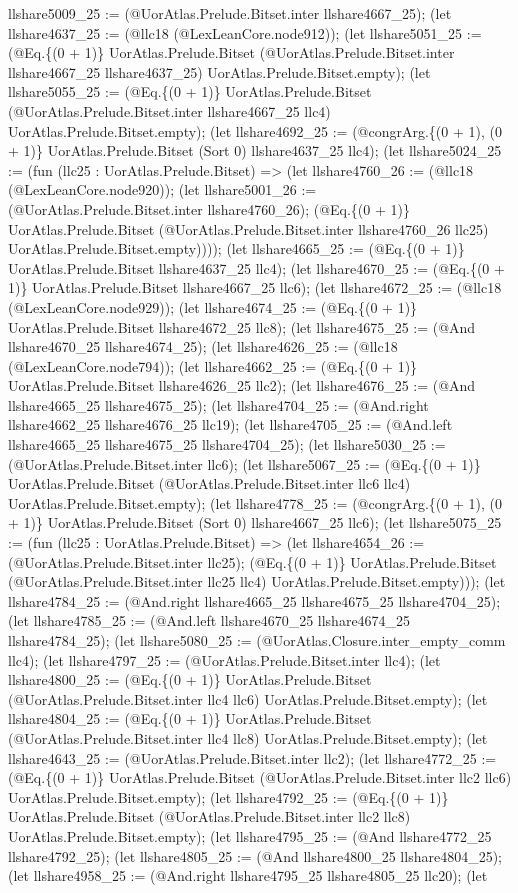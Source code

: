 \documentclass[11pt]{article}
\begin{document}
llshare5009\_25 := (@UorAtlas.Prelude.Bitset.inter llshare4667\_25); (let llshare4637\_25 := (@llc18 (@LexLeanCore.node912)); (let llshare5051\_25 := (@Eq.\{(0 + 1)\} UorAtlas.Prelude.Bitset (@UorAtlas.Prelude.Bitset.inter llshare4667\_25 llshare4637\_25) UorAtlas.Prelude.Bitset.empty); (let llshare5055\_25 := (@Eq.\{(0 + 1)\} UorAtlas.Prelude.Bitset (@UorAtlas.Prelude.Bitset.inter llshare4667\_25 llc4) UorAtlas.Prelude.Bitset.empty); (let llshare4692\_25 := (@congrArg.\{(0 + 1), (0 + 1)\} UorAtlas.Prelude.Bitset (Sort 0) llshare4637\_25 llc4); (let llshare5024\_25 := (fun (llc25 : UorAtlas.Prelude.Bitset) => (let llshare4760\_26 := (@llc18 (@LexLeanCore.node920)); (let llshare5001\_26 := (@UorAtlas.Prelude.Bitset.inter llshare4760\_26); (@Eq.\{(0 + 1)\} UorAtlas.Prelude.Bitset (@UorAtlas.Prelude.Bitset.inter llshare4760\_26 llc25) UorAtlas.Prelude.Bitset.empty)))); (let llshare4665\_25 := (@Eq.\{(0 + 1)\} UorAtlas.Prelude.Bitset llshare4637\_25 llc4); (let llshare4670\_25 := (@Eq.\{(0 + 1)\} UorAtlas.Prelude.Bitset llshare4667\_25 llc6); (let llshare4672\_25 := (@llc18 (@LexLeanCore.node929)); (let llshare4674\_25 := (@Eq.\{(0 + 1)\} UorAtlas.Prelude.Bitset llshare4672\_25 llc8); (let llshare4675\_25 := (@And llshare4670\_25 llshare4674\_25); (let llshare4626\_25 := (@llc18 (@LexLeanCore.node794)); (let llshare4662\_25 := (@Eq.\{(0 + 1)\} UorAtlas.Prelude.Bitset llshare4626\_25 llc2); (let llshare4676\_25 := (@And llshare4665\_25 llshare4675\_25); (let llshare4704\_25 := (@And.right llshare4662\_25 llshare4676\_25 llc19); (let llshare4705\_25 := (@And.left llshare4665\_25 llshare4675\_25 llshare4704\_25); (let llshare5030\_25 := (@UorAtlas.Prelude.Bitset.inter llc6); (let llshare5067\_25 := (@Eq.\{(0 + 1)\} UorAtlas.Prelude.Bitset (@UorAtlas.Prelude.Bitset.inter llc6 llc4) UorAtlas.Prelude.Bitset.empty); (let llshare4778\_25 := (@congrArg.\{(0 + 1), (0 + 1)\} UorAtlas.Prelude.Bitset (Sort 0) llshare4667\_25 llc6); (let llshare5075\_25 := (fun (llc25 : UorAtlas.Prelude.Bitset) => (let llshare4654\_26 := (@UorAtlas.Prelude.Bitset.inter llc25); (@Eq.\{(0 + 1)\} UorAtlas.Prelude.Bitset (@UorAtlas.Prelude.Bitset.inter llc25 llc4) UorAtlas.Prelude.Bitset.empty))); (let llshare4784\_25 := (@And.right llshare4665\_25 llshare4675\_25 llshare4704\_25); (let llshare4785\_25 := (@And.left llshare4670\_25 llshare4674\_25 llshare4784\_25); (let llshare5080\_25 := (@UorAtlas.Closure.inter\_empty\_comm llc4); (let llshare4797\_25 := (@UorAtlas.Prelude.Bitset.inter llc4); (let llshare4800\_25 := (@Eq.\{(0 + 1)\} UorAtlas.Prelude.Bitset (@UorAtlas.Prelude.Bitset.inter llc4 llc6) UorAtlas.Prelude.Bitset.empty); (let llshare4804\_25 := (@Eq.\{(0 + 1)\} UorAtlas.Prelude.Bitset (@UorAtlas.Prelude.Bitset.inter llc4 llc8) UorAtlas.Prelude.Bitset.empty); (let llshare4643\_25 := (@UorAtlas.Prelude.Bitset.inter llc2); (let llshare4772\_25 := (@Eq.\{(0 + 1)\} UorAtlas.Prelude.Bitset (@UorAtlas.Prelude.Bitset.inter llc2 llc6) UorAtlas.Prelude.Bitset.empty); (let llshare4792\_25 := (@Eq.\{(0 + 1)\} UorAtlas.Prelude.Bitset (@UorAtlas.Prelude.Bitset.inter llc2 llc8) UorAtlas.Prelude.Bitset.empty); (let llshare4795\_25 := (@And llshare4772\_25 llshare4792\_25); (let llshare4805\_25 := (@And llshare4800\_25 llshare4804\_25); (let llshare4958\_25 := (@And.right llshare4795\_25 llshare4805\_25 llc20); (let 
\end{document}

